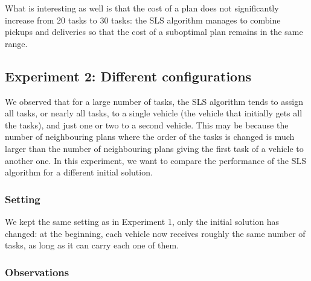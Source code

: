 \documentclass[10pt]{article}
\begin{document}
What is interesting as well is that the cost of a plan does not significantly increase from 20 tasks to 30 tasks: the SLS algorithm manages to combine pickups and deliveries so that the cost of a suboptimal plan remains in the same range.


\subsection{Experiment 2: Different configurations}
We observed that for a large number of tasks, the SLS algorithm tends to assign all tasks, or nearly all tasks, to a single vehicle (the vehicle that initially gets all the tasks), and just one or two to a second vehicle.
This may be because the number of neighbouring plans where the order of the tasks is changed is much larger than the number of neighbouring plans giving the first task of a vehicle to another one. 
In this experiment, we want to compare the performance of the SLS algorithm for a different initial solution. 
\subsubsection{Setting}
We kept the same setting as in Experiment 1, only the initial solution has changed: at the beginning, each vehicle now receives roughly the same number of tasks, as long as it can carry each one of them.

\subsubsection{Observations}
\end{document}
